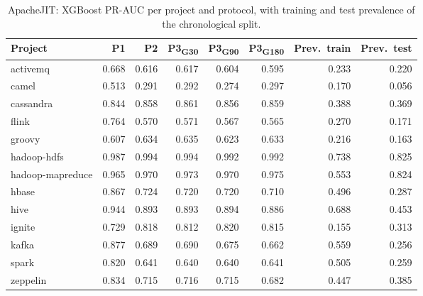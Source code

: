 \begin{table}[h]
\centering
\caption{ApacheJIT: XGBoost PR-AUC per project and protocol, with training and test prevalence of the chronological split.}
\label{tab:perproject}
\small
\begin{tabular}{lrrrrrrr}
\toprule
Project & P1 & P2 & P3\textsubscript{G30} & P3\textsubscript{G90} & P3\textsubscript{G180} & Prev.\ train & Prev.\ test \\
\midrule
activemq          & 0.668 & 0.616 & 0.617 & 0.604 & 0.595 & 0.233 & 0.220 \\
camel             & 0.513 & 0.291 & 0.292 & 0.274 & 0.297 & 0.170 & 0.056 \\
cassandra         & 0.844 & 0.858 & 0.861 & 0.856 & 0.859 & 0.388 & 0.369 \\
flink             & 0.764 & 0.570 & 0.571 & 0.567 & 0.565 & 0.270 & 0.171 \\
groovy            & 0.607 & 0.634 & 0.635 & 0.623 & 0.633 & 0.216 & 0.163 \\
hadoop-hdfs       & 0.987 & 0.994 & 0.994 & 0.992 & 0.992 & 0.738 & 0.825 \\
hadoop-mapreduce  & 0.965 & 0.970 & 0.973 & 0.970 & 0.975 & 0.553 & 0.824 \\
hbase             & 0.867 & 0.724 & 0.720 & 0.720 & 0.710 & 0.496 & 0.287 \\
hive              & 0.944 & 0.893 & 0.893 & 0.894 & 0.886 & 0.688 & 0.453 \\
ignite            & 0.729 & 0.818 & 0.812 & 0.820 & 0.815 & 0.155 & 0.313 \\
kafka             & 0.877 & 0.689 & 0.690 & 0.675 & 0.662 & 0.559 & 0.256 \\
spark             & 0.820 & 0.641 & 0.640 & 0.640 & 0.641 & 0.505 & 0.259 \\
zeppelin          & 0.834 & 0.715 & 0.716 & 0.715 & 0.682 & 0.447 & 0.385 \\
\bottomrule
\end{tabular}
\end{table}

